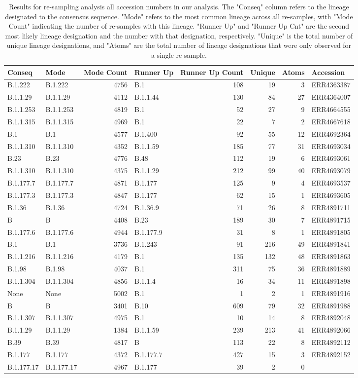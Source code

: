 \documentclass[
]{article}
\begin{document}
\begin{longtable}[]{@{}llrlrrrl@{}}
\caption{\label{tab:pango}Results for re-sampling analysis all accession numbers in our analysis. The "Conseq" column refers to the lineage designated to the consensus sequence. "Mode" refers to the most common lineage across all re-samples, with "Mode Count" indicating the number of re-samples with this lineage. "Runner Up" and "Runner Up Cnt" are the second most likely lineage designation and the number with that designation, respectively. "Unique" is the total number of unique lineage designations, and "Atoms" are the total number of lineage designations that were only observed for a single re-sample.}\\
\toprule
Conseq & Mode & Mode Count & Runner Up & Runner Up Count & Unique & Atoms & Accession\tabularnewline
\midrule
\endhead
B.1.222 & B.1.222 & 4756 & B.1 & 108 & 19 & 3 &
ERR4363387\tabularnewline
B.1.1.29 & B.1.1.29 & 4112 & B.1.1.44 & 130 & 84 & 27 &
ERR4364007\tabularnewline
B.1.1.253 & B.1.1.253 & 4819 & B.1 & 52 & 27 & 9 &
ERR4664555\tabularnewline
B.1.1.315 & B.1.1.315 & 4969 & B.1 & 22 & 7 & 2 &
ERR4667618\tabularnewline
B.1 & B.1 & 4577 & B.1.400 & 92 & 55 & 12 & ERR4692364\tabularnewline
B.1.1.310 & B.1.1.310 & 4352 & B.1.1.59 & 185 & 77 & 31 &
ERR4693034\tabularnewline
B.23 & B.23 & 4776 & B.48 & 112 & 19 & 6 & ERR4693061\tabularnewline
B.1.1.310 & B.1.1.310 & 4375 & B.1.1.29 & 212 & 99 & 40 &
ERR4693079\tabularnewline
B.1.177.7 & B.1.177.7 & 4871 & B.1.177 & 125 & 9 & 4 &
ERR4693537\tabularnewline
B.1.177.3 & B.1.177.3 & 4847 & B.1.177 & 62 & 15 & 1 &
ERR4693605\tabularnewline
B.1.36 & B.1.36 & 4724 & B.1.36.9 & 71 & 26 & 8 &
ERR4891711\tabularnewline
B & B & 4408 & B.23 & 189 & 30 & 7 & ERR4891715\tabularnewline
B.1.177.6 & B.1.177.6 & 4944 & B.1.177.9 & 31 & 8 & 1 &
ERR4891805\tabularnewline
B.1 & B.1 & 3736 & B.1.243 & 91 & 216 & 49 & ERR4891841\tabularnewline
B.1.1.216 & B.1.1.216 & 4179 & B.1 & 135 & 132 & 48 &
ERR4891863\tabularnewline
B.1.98 & B.1.98 & 4037 & B.1 & 311 & 75 & 36 & ERR4891889\tabularnewline
B.1.1.304 & B.1.1.304 & 4856 & B.1.1.4 & 16 & 34 & 11 &
ERR4891898\tabularnewline
None & None & 5002 & B.1 & 1 & 2 & 1 & ERR4891916\tabularnewline
B & B & 3401 & B.10 & 609 & 79 & 32 & ERR4891988\tabularnewline
B.1.1.307 & B.1.1.307 & 4975 & B.1 & 10 & 14 & 8 &
ERR4892048\tabularnewline
B.1.1.29 & B.1.1.29 & 1384 & B.1.1.59 & 239 & 213 & 41 &
ERR4892066\tabularnewline
B.39 & B.39 & 4817 & B & 113 & 22 & 8 & ERR4892112\tabularnewline
B.1.177 & B.1.177 & 4372 & B.1.177.7 & 427 & 15 & 3 &
ERR4892152\tabularnewline
B.1.177.17 & B.1.177.17 & 4967 & B.1.177 & 39 & 2 & 0 &

\end{longtable}
\end{document}
